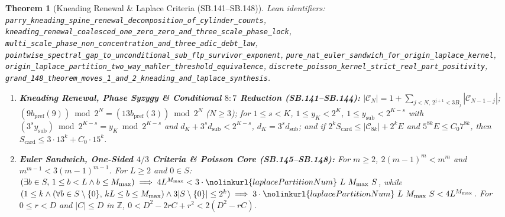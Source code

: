 \documentclass[11pt]{article}
\newtheorem{theorem}{Theorem}[section]
\begin{document}
\begin{theorem}[Kneading Renewal \& Laplace Criteria (SB.141--SB.148)]
\emph{Lean identifiers:} \nolinkurl{parry_kneading_spine_renewal_decomposition_of_cylinder_counts}, \nolinkurl{kneading_renewal_coalesced_one_zero_zero_and_three_scale_phase_lock}, \nolinkurl{multi_scale_phase_non_concentration_and_three_adic_debt_law}, \nolinkurl{pointwise_spectral_gap_to_unconditional_sub_flp_survivor_exponent}, \nolinkurl{pure_nat_euler_sandwich_for_origin_laplace_kernel}, \nolinkurl{origin_laplace_partition_two_way_mahler_threshold_equivalence}, \nolinkurl{discrete_poisson_kernel_strict_real_part_positivity}, \nolinkurl{grand_148_theorem_moves_1_and_2_kneading_and_laplace_synthesis}.
\begin{enumerate}
  \item \textbf{Kneading Renewal, Phase Syzygy \& Conditional $8:7$ Reduction (SB.141--SB.144):} $|\mathcal{C}_N| = 1 + \sum_{j < N,\, 2^{j+1} < 3 B_j} |\mathcal{C}_{N-1-j}|$; $(9 b_{\text{pref}}(9)) \bmod 2^N = (13 b_{\text{pref}}(3)) \bmod 2^N$ ($N \ge 3$); for $1 \le s < K$, $1 \le y_K < 2^K$, $1 \le y_{\text{sub}} < 2^{K-s}$ with $(3^s y_{\text{sub}}) \bmod 2^{K-s} = y_K \bmod 2^{K-s}$ and $d_K + 3^s d_{\text{sub}} < 2^{K-s}$, $d_K = 3^s d_{\text{sub}}$; and if $2^k S_{\text{card}} \le |\mathcal{C}_{8k}| + 2^k E$ and $5^{8k} E \le C_0 7^{8k}$, then $S_{\text{card}} \le 3 \cdot 13^k + C_0 \cdot 15^k$.
  \item \textbf{Euler Sandwich, One-Sided $4/3$ Criteria \& Poisson Core (SB.145--SB.148):} For $m \ge 2$, $2(m-1)^m < m^m$ and $m^{m-1} < 3(m-1)^{m-1}$. For $L \ge 2$ and $0 \in S$: $(\exists b \in S,\, 1 \le b < L \wedge b \le M_{\max}) \implies 4 L^{M_{\max}} < 3 \cdot \nolinkurl{laplacePartitionNum}\ L\ M_{\max}\ S$, while $(1 \le k \wedge (\forall b \in S \setminus \{0\},\, k L \le b \le M_{\max}) \wedge 3|S \setminus \{0\}| \le 2^k) \implies 3 \cdot \nolinkurl{laplacePartitionNum}\ L\ M_{\max}\ S < 4 L^{M_{\max}}$. For $0 \le r < D$ and $|C| \le D$ in $\mathbb{Z}$, $0 < D^2 - 2 r C + r^2 < 2(D^2 - r C)$.
\end{enumerate}
\end{theorem}
\end{document}
